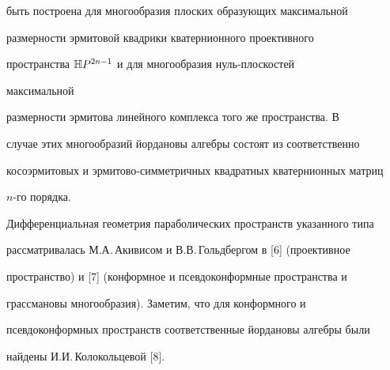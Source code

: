быть построена для многообразия плоских образующих максимальной


размерности эрмитовой квадрики кватернионного проективного


пространства $\Bbb HP^{2n-1}$ и для многообразия нуль-плоскостей


максимальной


размерности эрмитова линейного комплекса того же пространства. В


случае этих многообразий йордановы алгебры состоят из соответственно


косоэрмитовых и эрмитово-симметричных квадратных кватернионных матриц


$n$-го порядка.


\medskip





Дифференциальная геометрия параболических пространств указанного типа


рассматривалась М.А.\,Акивисом и В.В.\,Гольдбергом в [6] (проективное


пространство) и [7] (конформное и псевдоконформные пространства и


грассмановы многообразия). Заметим, что для конформного и


псевдоконформных пространств соответственные йордановы алгебры были


найдены И.И.\,Колокольцевой [8].





